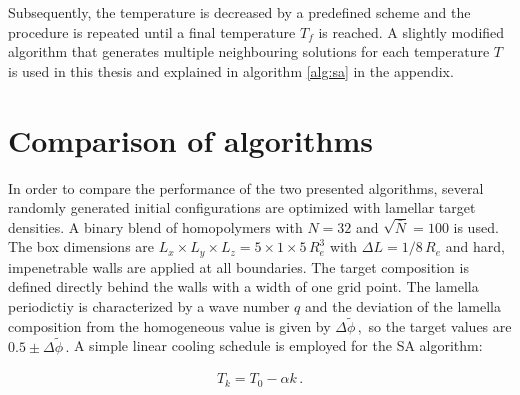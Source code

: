 \documentclass[bachelor,       %
               twoside,        %
               BCOR10mm,       %
               ngerman, english %
               ]{GAUBM}
\begin{document}
Subsequently, the temperature is decreased by a predefined scheme and the procedure is repeated until a final temperature $T_f$ is reached. A slightly modified algorithm that generates multiple neighbouring solutions for each temperature $T$ is used in this thesis and explained in algorithm \ref{alg:sa} in the appendix.

\section{Comparison of algorithms}

In order to compare the performance of the two presented algorithms, several randomly generated initial configurations are optimized with lamellar  target densities. A binary blend of homopolymers with $N=32$ and $\sqrt{\bar N}=100$ is used. The box dimensions are $L_x\times L_y\times L_z=5\times1\times5\,R_e^3$ with $\Delta L=1/8\,R_e$ and hard, impenetrable  walls are applied at all boundaries. The target composition is defined directly behind the walls with a width of one grid point. The lamella periodictiy is characterized by a wave number $q$ and the deviation of the lamella composition from the homogeneous value is given by $\Delta\tilde\phi\,,$ so the target values are $0.5\pm\Delta\tilde\phi\,.$ A simple linear cooling schedule is employed for the \ac{SA} algorithm:

\begin{align}
    T_k=T_0-\alpha k\,.
\end{align}
\end{document}
